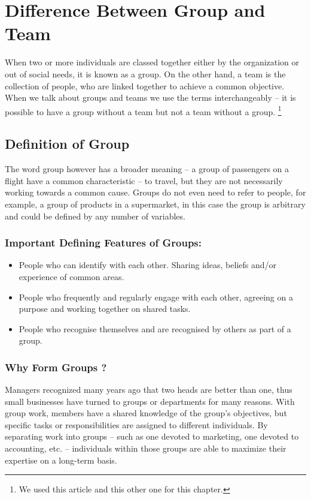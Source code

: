 \documentclass[a4paper,12pt]{report} %
\begin{document}
\chapter{Difference Between Group and Team}\newpage
When two or more individuals are classed together either by the organization or out of social needs, it is known as a group.
On the other hand, a team is the collection of people, who are linked together to achieve a common objective.
When we talk about groups and teams we use the terms interchangeably – it is possible to have a group without a team but not a team without a group. 
\footnote{We used this article \cite{GroupTeam:2} and this other one \cite{GroupTeam:3} for this chapter.}
\section{Definition of Group}
The word group however has a broader meaning – a group of passengers on a flight have a common characteristic – to travel, but they are not necessarily working towards a common cause. Groups do not even need to refer to people, for example, a group of products in a supermarket, in this case the group is arbitrary and could be defined by any number of variables.
\subsection{Important Defining Features of Groups:}
\begin{itemize}
\item People who can identify with each other.  Sharing ideas, beliefs and/or experience of common areas.
\item People who frequently and regularly engage with each other, agreeing on a purpose and working together on shared tasks.
\item People who recognise themselves and are recognised by others as part of a group.
\end{itemize}
\subsection{Why Form Groups ?}
Managers recognized many years ago that two heads are better than one, thus small businesses have turned to groups or departments for many reasons. With group work, members have a shared knowledge of the group’s objectives, but specific tasks or responsibilities are assigned to different individuals. By separating work into groups – such as one devoted to marketing, one devoted to accounting, etc. – individuals within those groups are able to maximize their expertise on a long-term basis.
\end{document}
